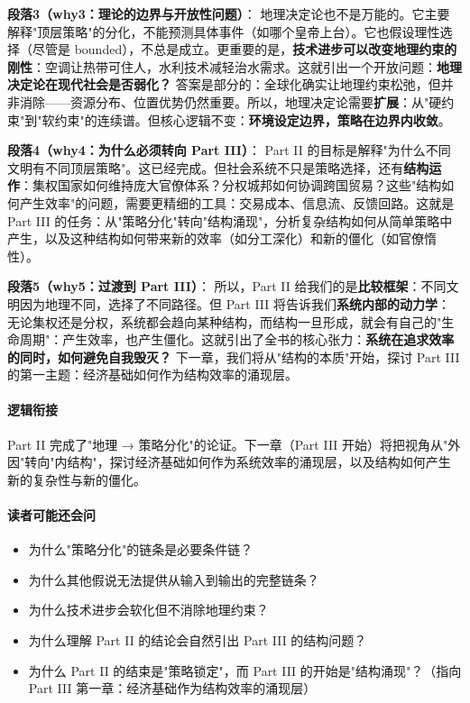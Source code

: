 \documentclass[../main.tex]{subfiles}
\begin{document}
	\textbf{段落3（why3：理论的边界与开放性问题）}：  
	地理决定论也不是万能的。它主要解释"顶层策略"的分化，不能预测具体事件（如哪个皇帝上台）。它也假设理性选择（尽管是 bounded），不总是成立。更重要的是，\textbf{技术进步可以改变地理约束的刚性}：空调让热带可住人，水利技术减轻治水需求。这就引出一个开放问题：\textbf{地理决定论在现代社会是否弱化？} 答案是部分的：全球化确实让地理约束松弛，但并非消除——资源分布、位置优势仍然重要。所以，地理决定论需要\textbf{扩展}：从"硬约束"到"软约束"的连续谱。但核心逻辑不变：\textbf{环境设定边界，策略在边界内收敛}。
	
	\textbf{段落4（why4：为什么必须转向 Part III）}：  
	Part II 的目标是解释"为什么不同文明有不同顶层策略"。这已经完成。但社会系统不只是策略选择，还有\textbf{结构运作}：集权国家如何维持庞大官僚体系？分权城邦如何协调跨国贸易？这些"结构如何产生效率"的问题，需要更精细的工具：交易成本、信息流、反馈回路。这就是 Part III 的任务：从"策略分化"转向"结构涌现"，分析复杂结构如何从简单策略中产生，以及这种结构如何带来新的效率（如分工深化）和新的僵化（如官僚惰性）。
	
	\textbf{段落5（why5：过渡到 Part III）}：  
	所以，Part II 给我们的是\textbf{比较框架}：不同文明因为地理不同，选择了不同路径。但 Part III 将告诉我们\textbf{系统内部的动力学}：无论集权还是分权，系统都会趋向某种结构，而结构一旦形成，就会有自己的"生命周期"：产生效率，也产生僵化。这就引出了全书的核心张力：\textbf{系统在追求效率的同时，如何避免自我毁灭？} 下一章，我们将从"结构的本质"开始，探讨 Part III 的第一主题：经济基础如何作为结构效率的涌现层。
	
	\paragraph*{逻辑衔接}
	Part II 完成了"地理 → 策略分化"的论证。下一章（Part III 开始）将把视角从"外因"转向"内结构"，探讨经济基础如何作为系统效率的涌现层，以及结构如何产生新的复杂性与新的僵化。
	
	\paragraph*{读者可能还会问}
	\begin{itemize}
\item 为什么"策略分化"的链条是必要条件链？
	\item 为什么其他假说无法提供从输入到输出的完整链条？
	\item 为什么技术进步会软化但不消除地理约束？
	\item 为什么理解 Part II 的结论会自然引出 Part III 的结构问题？
	\item 为什么 Part II 的结束是"策略锁定"，而 Part III 的开始是"结构涌现"？（指向 Part III 第一章：经济基础作为结构效率的涌现层）
\end{itemize}
	
\end{document}
